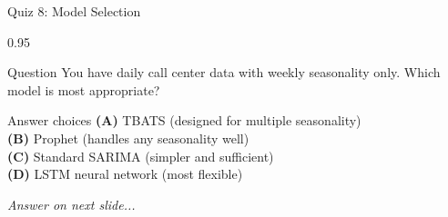 \documentclass[9pt, aspectratio=169, t]{beamer}
\begin{document}
\begin{frame}{Quiz 8: Model Selection}
    \begin{cminipage}{0.95\textwidth}
    \begin{alertblock}{Question}
        You have daily call center data with weekly seasonality only. Which model is most appropriate?
    \end{alertblock}

    \vspace{0.4cm}

    \begin{block}{Answer choices}
        \textcolor{MainBlue}{\textbf{(A)}} TBATS (designed for multiple seasonality)\\[3pt]
        \textcolor{MainBlue}{\textbf{(B)}} Prophet (handles any seasonality well)\\[3pt]
        \textcolor{MainBlue}{\textbf{(C)}} Standard SARIMA (simpler and sufficient)\\[3pt]
        \textcolor{MainBlue}{\textbf{(D)}} LSTM neural network (most flexible)
    \end{block}

    \vspace{0.5cm}

    \begin{center}
        \textit{Answer on next slide...}
    \end{center}
    \end{cminipage}
\end{frame}
\end{document}
